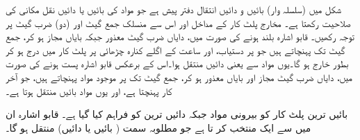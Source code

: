 شکل   میں   (سلسلہ وار) بائیں و دائیں  انتقال دفتر پیش ہے جو  مواد کی بائیں یا دائیں  نقل مکانی کی صلاحیت رکھتا ہے۔ مخارج    پلٹ کار کے مداخل  اور اس سے منسلک جمع گیٹ  اور (دو)  ضرب گیٹ  پر توجہ رکھیں۔  قابو اشارہ   بلند ہونے کی صورت میں، دایاں ضرب گیٹ معذور جبکہ بایاں  مجاز ہو کر،     جمع گیٹ تک   پہنچاتے ہیں جو   پر دستیاب،  اور   ساعت کے اگلے کنارہ چڑھائی پر پلٹ کار میں درج ہو کر بطور  خارج ہو گا۔یوں مواد  سے  یعنی دائیں منتقل ہوا۔اس کے برعکس قابو اشارہ پست ہونے کی صورت میں، دایاں ضرب گیٹ مجاز  اور بایاں معذور ہو کر،   جمع گیٹ تک   پر موجود مواد    پہنچاتے ہیں، جو  آخر کار   پہنچتا  ہے، اور یوں مواد بائیں منتقل ہوتا ہے۔

 بائیں ترین پلٹ کار کو بیرونی مواد   جبکہ دائیں ترین کو  فراہم کیا گیا ہے۔ قابو اشارہ ان میں سے ایک منتخب کر تا ہے جو مطلوبہ سمت ( بائیں یا دائیں) منتقل ہو گا۔   

